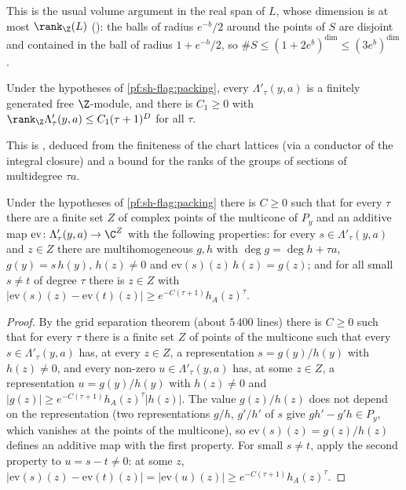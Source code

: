 This is the usual volume argument in the real span of $L$, whose dimension is at most $\rank_\Z(L)$
(): the balls of radius $e^{-b}/2$ around the points of $S$ are
disjoint and contained in the ball of radius $1+e^{-b}/2$, so $\#S\le(1+2e^b)^{\dim}\le(3e^b)^{\dim}$.

\begin{lemma}\label{pf:sh-flag:rank}
Under the hypotheses of \cref{pf:sh-flag:packing}, every $\Lambda'_\tau(y,a)$ is a finitely generated free $\Z$-module, and there is
$C_1\ge0$ with $\rank_\Z\Lambda'_\tau(y,a)\le C_1(\tau+1)^D$ for all $\tau$.
\end{lemma}

This is , deduced from the finiteness of the chart lattices
(via a conductor of the integral closure) and a bound for the ranks of the groups of sections of multidegree $\tau a$.

\begin{proposition}\label{pf:sh-flag:sep}
Under the hypotheses of \cref{pf:sh-flag:packing} there is $C\ge0$ such that for every $\tau$ there are a finite set $Z$ of complex points
of the multicone of $P_y$ and an additive map $\mathrm{ev}\colon\Lambda'_\tau(y,a)\to\C^Z$ with the following properties: for every
$s\in\Lambda'_\tau(y,a)$ and $z\in Z$ there are multihomogeneous $g,h$ with $\deg g=\deg h+\tau a$, $g(y)=s\,h(y)$, $h(z)\ne0$ and
$\mathrm{ev}(s)(z)\,h(z)=g(z)$; and for all small $s\ne t$ of degree $\tau$ there is $z\in Z$ with
$|\mathrm{ev}(s)(z)-\mathrm{ev}(t)(z)|\ge e^{-C(\tau+1)}h_A(z)^\tau$.
\end{proposition}

\begin{proof}
By the grid separation theorem  (about $5\,400$ lines) there is $C\ge0$ such that for
every $\tau$ there is a finite set $Z$ of points of the multicone such that every $s\in\Lambda'_\tau(y,a)$ has, at every $z\in Z$, a
representation $s=g(y)/h(y)$ with $h(z)\ne0$, and every non-zero $u\in\Lambda'_\tau(y,a)$ has, at some $z\in Z$, a representation $u=g(y)/h(y)$
with $h(z)\ne0$ and $|g(z)|\ge e^{-C(\tau+1)}h_A(z)^\tau|h(z)|$. The value $g(z)/h(z)$ does not depend on the representation (two
representations $g/h$, $g'/h'$ of $s$ give $gh'-g'h\in P_y$, which vanishes at the points of the multicone), so
$\mathrm{ev}(s)(z)=g(z)/h(z)$ defines an additive map with the first property. For small $s\ne t$, apply the second property to $u=s-t\ne0$:
at some $z$, $|\mathrm{ev}(s)(z)-\mathrm{ev}(t)(z)|=|\mathrm{ev}(u)(z)|\ge e^{-C(\tau+1)}h_A(z)^\tau$.
\end{proof}

